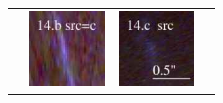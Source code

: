 \documentclass[useAMS,usenatbib]{mn2e}
\begin{document}
\begin{table}
\begin{tabular}{cccc}
    & \multicolumn{1}{m{1.7cm}}{\includegraphics[height=2.00cm,clip]{figs/enfw_img/rgb.pre_14_b_c_tri.ps}}
    & \multicolumn{1}{m{1.7cm}}{\includegraphics[height=2.00cm,clip]{figs/enfw_img/rgb.src_14_c.ps}} \\
  \end{tabular}

\end{table}
\end{document}
